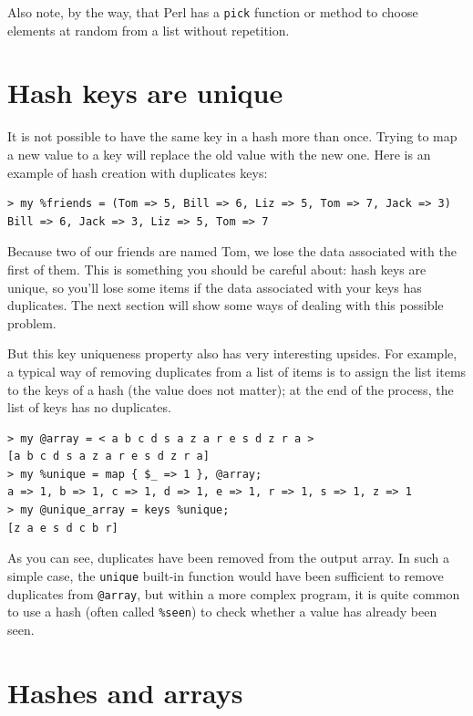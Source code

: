 Also note, by the way, that Perl has a {\tt pick} function or 
method to choose elements at random from a list without 
repetition.


\section{Hash keys are unique}

It is not possible to have the same key in a hash more than once. 
Trying to map a new value to a key will replace the old 
value with the new one. Here is an example of hash creation 
with duplicates keys:

\begin{verbatim}
> my %friends = (Tom => 5, Bill => 6, Liz => 5, Tom => 7, Jack => 3)
Bill => 6, Jack => 3, Liz => 5, Tom => 7
\end{verbatim}

Because two of our friends are named Tom, we lose the data 
associated with the first of them. This is something you should 
be careful about: hash keys are unique, so you'll lose some items  
if the data associated with your keys has duplicates. The 
next section will show some ways of dealing with this 
possible problem.

But this key uniqueness property also has very interesting upsides. 
For example, a typical way of removing duplicates from a list of 
items is to assign the list items to the keys of a hash (the 
value does not matter); at the end of the process, the list of 
keys has no duplicates.

\begin{verbatim}
> my @array = < a b c d s a z a r e s d z r a >
[a b c d s a z a r e s d z r a]
> my %unique = map { $_ => 1 }, @array;
a => 1, b => 1, c => 1, d => 1, e => 1, r => 1, s => 1, z => 1
> my @unique_array = keys %unique;
[z a e s d c b r]
\end{verbatim}

As you can see, duplicates have been removed from the output 
array. In such a simple case, the {\tt unique} built-in function 
would have been sufficient to remove duplicates from 
\verb'@array', but within a more complex program, 
it is quite common to use a hash (often called \verb'%seen') 
to check whether a value has already been seen.

\section{Hashes and arrays}
\label{invert}

